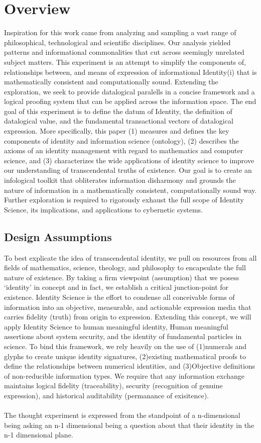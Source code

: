 \documentclass{article}
\begin{document}
\section{Overview}
Inspiration for this work came from analyzing and sampling a vast range of philosophical, technological and scientific disciplines.  Our analysis yielded patterns and informational commonalities that cut across seemingly unrelated subject matters. This experiment is an attempt to simplify the components of, relationships between, and means of expression of informational Identity(i) that is mathematically consistent and computationally sound.  Extending the exploration, we seek to provide datalogical paralells in a concise framework and a logical proofing system that can be applied across the information space.  The end goal of this experiment is to define the datum of Identity, the definition of datalogical value, and the fundamental transactional vectors of datalogical expression.  More specifically, this paper (1) measures and defines the key components of identity and information science (ontology), (2) describes the axioms of an identity management with regard to mathematics and computer science, and (3) characterizes the wide applications of identity science to improve our understanding of transcendental truths of existence.  Our goal is to create an infological toolkit that obliterates information disharmony and grounds the nature of information in a mathematically consistent, computationally sound way.  Further exploration is required to rigorously exhaust the full scope of Identity Science, its implications, and applications to cybernetic systems.

\subsection{Design Assumptions}
To best explicate the idea of transcendental identity, we pull on resources from all fields of mathematics, science, theology, and philosophy to encapsulate the full nature of existence.  By taking a firm viewpoint (assumption) that we posess ‘identity’ in concept and in fact, we  establish a critical junction-point for existence.  Identity Science is the effort to condense all conceivable forms of information into an objective, measurable, and actionable expression media that carries fidelity (truth) from origin to expression.  Extending this concept, we will apply Identity Science to human meaningful identity, Human meaningful assertions about system security, and the identity of fundamental particles in science.  To bind this framework, we rely heavily on the use of (1)numerals and glyphs to create unique identity signatures, (2)existing mathematical proofs to define the relationships between numerical identities, and (3)Objective definitions of non-reducible information types.  We require that any information exchange maintains logical fidelity (traceability), security (recognition of genuine expression), and historical auditability (permanance of exisitence).\\\\
The thought experiment is expressed from the standpoint of a n-dimensional being asking an n-1 dimensional being a question about that their identity in the n-1 dimensional plane. 
\end{document}
